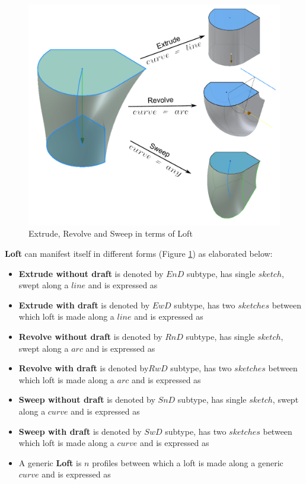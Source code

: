 \begin{figure}[htbp]
	\includegraphics[scale=0.35]{../Common/images//LoftExtrudeRevSwp.pdf} 
\caption{Extrude, Revolve and Sweep in terms of Loft}
\label{figure_extrevswp}
\end{figure}

{\bf Loft} can manifest itself in different forms (Figure \ref{figure_extrevswp}) as elaborated below:
\begin{itemize}[noitemsep,topsep=2pt,parsep=2pt,partopsep=2pt,label={},leftmargin=*]
\item {\bf Extrude without draft} is denoted by $EnD$ subtype, has single $sketch$, swept along a $line$ and is expressed as			
\item {\bf Extrude with draft} is denoted by $EwD$ subtype, has two $sketches$ between which loft is made along a $line$ and is expressed as 	
\item {\bf Revolve without draft} is denoted by $RnD$ subtype, has single $sketch$, swept along a $arc$ and is expressed as			
\item {\bf Revolve with draft} is denoted by$ RwD$ subtype, has two $sketches$ between which loft is made along a $arc$ and is expressed as	
\item {\bf Sweep without draft} is denoted by $SnD$ subtype, has single $sketch$, swept along a $curve$ and is expressed as			
\item {\bf Sweep with draft} is denoted by $SwD$ subtype, has two $sketches$ between which loft is made along a $curve$ and is expressed as 	
\item A generic {\bf Loft} is $n$ profiles between which a loft is made along a generic $curve$ and is expressed as  
\end{itemize}


